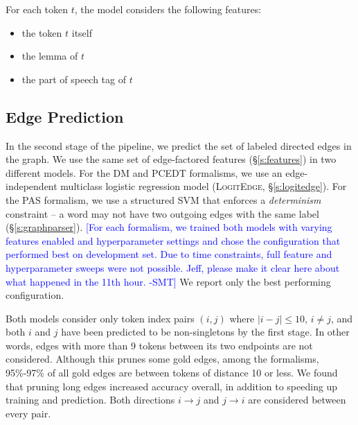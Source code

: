 \documentclass[11pt]{article}
\newcommand{\bocomment}[1]{\textcolor{Bittersweet}{[#1 -BTO]}}
\newcommand{\sam}[1]{\textcolor{blue}{[#1 -SMT]}}
\newcommand{\logitedge}{\textsc{LogitEdge}}
\begin{document}
For each token $t$, the model considers the following features:
\begin{itemize}
\item the token $t$ itself
\item the lemma of $t$
\item the part of speech tag of $t$
\end{itemize}



\subsection{Edge Prediction} \label{s:edge_model}

In the second stage of the pipeline, we predict the set of labeled directed
edges in the graph.
We use the same set of edge-factored features (\S\ref{s:features}) in two
different models.
For the DM and PCEDT formalisms, we use an edge-independent multiclass logistic
regression model (\logitedge, \S\ref{s:logitedge}).
For the PAS formalism, we use a structured SVM 
\cite{taskar_max_2003,tsochantaridis_support_2004} that enforces a
\emph{determinism} constraint -- a word may not have two outgoing edges with the
same label (\S\ref{s:graphparser}).
\sam{For each formalism, we trained both models with varying features enabled
and hyperparameter settings and chose the configuration that performed best on
development set.
Due to time constraints, full feature and hyperparameter sweeps were not
possible.
Jeff, please make it clear here about what happened in the 11th
hour.}
We report only the best performing configuration.

Both models consider only token index pairs $(i, j)$ where %
$|i-j| \leq 10$, $i \ne j$, and both $i$ and
$j$ have been predicted to be non-singletons by the first stage.
In other words, edges with more than 9 tokens between its two endpoints are not
considered.
Although this prunes some gold edges, among the formalisms,
95\%-97\% of all gold edges are between tokens of distance 10 or less.
We found that pruning long edges increased accuracy overall, in addition to
speeding up training and prediction.
Both directions $i \rightarrow j$ and $j \rightarrow
i$ are considered between every pair.
\end{document}
